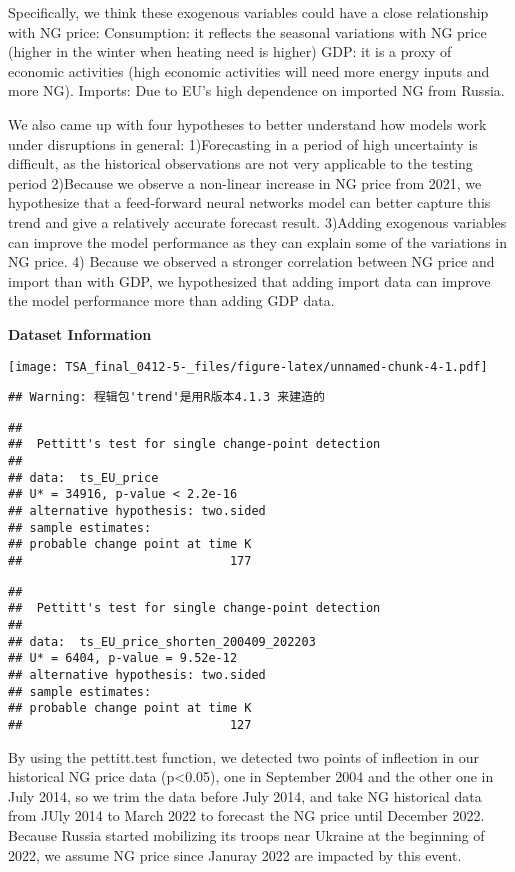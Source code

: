 \documentclass[
]{article}
\begin{document}
Specifically, we think these exogenous variables could have a close
relationship with NG price: Consumption: it reflects the seasonal
variations with NG price (higher in the winter when heating need is
higher) GDP: it is a proxy of economic activities (high economic
activities will need more energy inputs and more NG). Imports: Due to
EU's high dependence on imported NG from Russia.

We also came up with four hypotheses to better understand how models
work under disruptions in general: 1)Forecasting in a period of high
uncertainty is difficult, as the historical observations are not very
applicable to the testing period 2)Because we observe a non-linear
increase in NG price from 2021, we hypothesize that a feed-forward
neural networks model can better capture this trend and give a
relatively accurate forecast result. 3)Adding exogenous variables can
improve the model performance as they can explain some of the variations
in NG price. 4) Because we observed a stronger correlation between NG
price and import than with GDP, we hypothesized that adding import data
can improve the model performance more than adding GDP data.

\textbf{Dataset Information}

\texttt{[image: TSA\_final\_0412-5-\_files/figure-latex/unnamed-chunk-4-1.pdf]}

\begin{verbatim}
## Warning: 程辑包'trend'是用R版本4.1.3 来建造的
\end{verbatim}

\begin{verbatim}
## 
##  Pettitt's test for single change-point detection
## 
## data:  ts_EU_price
## U* = 34916, p-value < 2.2e-16
## alternative hypothesis: two.sided
## sample estimates:
## probable change point at time K 
##                             177
\end{verbatim}

\begin{verbatim}
## 
##  Pettitt's test for single change-point detection
## 
## data:  ts_EU_price_shorten_200409_202203
## U* = 6404, p-value = 9.52e-12
## alternative hypothesis: two.sided
## sample estimates:
## probable change point at time K 
##                             127
\end{verbatim}

By using the pettitt.test function, we detected two points of inflection
in our historical NG price data (p\textless0.05), one in September 2004
and the other one in July 2014, so we trim the data before July 2014,
and take NG historical data from JUly 2014 to March 2022 to forecast the
NG price until December 2022. Because Russia started mobilizing its
troops near Ukraine at the beginning of 2022, we assume NG price since
Januray 2022 are impacted by this event.
\end{document}
